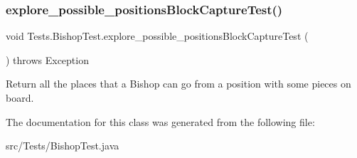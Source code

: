 \subsubsection{\texorpdfstring{explore\+\_\+possible\+\_\+positions\+Block\+Capture\+Test()}{explore\_possible\_positionsBlockCaptureTest()}}
{\footnotesize\ttfamily void Tests.\+Bishop\+Test.\+explore\+\_\+possible\+\_\+positions\+Block\+Capture\+Test (\begin{DoxyParamCaption}{ }\end{DoxyParamCaption}) throws Exception\hspace{0.3cm}{\ttfamily [inline]}}

Return all the places that a Bishop can go from a position with some pieces on board. 

The documentation for this class was generated from the following file\+:\begin{DoxyCompactItemize}
\item 
src/\+Tests/Bishop\+Test.\+java\end{DoxyCompactItemize}
